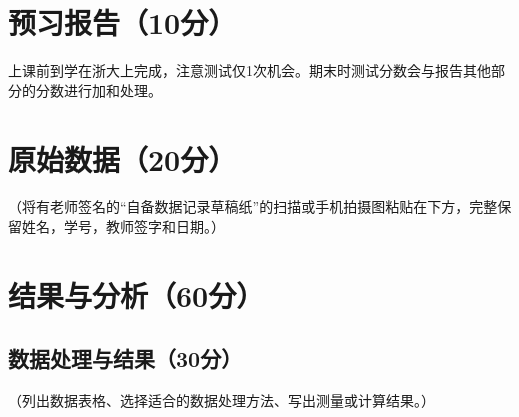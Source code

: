 \documentclass[]{../../templates/Report}%
\begin{document}
\maketitle%

\section{预习报告（10分）}
上课前到学在浙大上完成，注意测试仅1次机会。期末时测试分数会与报告其他部分的分数进行加和处理。

\section{原始数据（20分）}
（将有老师签名的“自备数据记录草稿纸”的扫描或手机拍摄图粘贴在下方，完整保留姓名，学号，教师签字和日期。）

\section{结果与分析（60分）}
\subsection{数据处理与结果（30分）}
（列出数据表格、选择适合的数据处理方法、写出测量或计算结果。）
\end{document}
